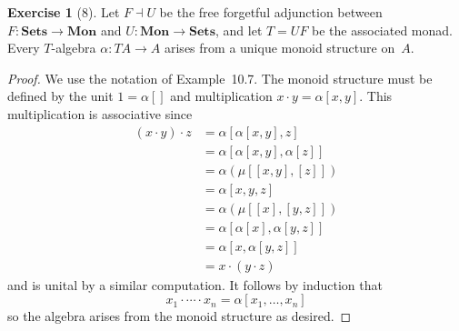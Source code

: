 \documentclass[letterpaper,12pt]{article}
\newcommand{\adj}{\dashv}
\newcommand{\mult}{\cdot}
\newcommand{\cat}[1]{\mathbf{#1}}
\newcommand{\Sets}{\cat{Sets}}
\newcommand{\Mon}{\cat{Mon}}
\theoremstyle{definition}
\newtheorem*{exer}{Exercise}
\theoremstyle{remark}
\theoremstyle{direction}
\begin{document}
\begin{exer}[8]
Let \(F\adj U\) be the free forgetful adjunction between \(F:\Sets\to\Mon\) and \(U:\Mon\to\Sets\), and let \(T=UF\) be the associated monad. Every \(T\)-algebra \(\alpha:TA\to A\) arises from a unique monoid structure on~\(A\).
\end{exer}
\begin{proof}
We use the notation of Example~10.7. The monoid structure must be defined by the unit \(1=\alpha[]\) and multiplication \(x\mult y=\alpha[x,y]\). This multiplication is associative since
\begin{align*}
(x\mult y)\mult z&=\alpha[\alpha[x,y],z]\\
	&=\alpha[\alpha[x,y],\alpha[z]]\\
	&=\alpha(\mu[[x,y],[z]])\\
	&=\alpha[x,y,z]\\
	&=\alpha(\mu[[x],[y,z]])\\
	&=\alpha[\alpha[x],\alpha[y,z]]\\
	&=\alpha[x,\alpha[y,z]]\\
	&=x\mult(y\mult z)
\end{align*}
and is unital by a similar computation. It follows by induction that
\[x_1\mult\cdots\mult x_n=\alpha[x_1,\ldots,x_n]\]
so the algebra arises from the monoid structure as desired.
\end{proof}
\end{document}
